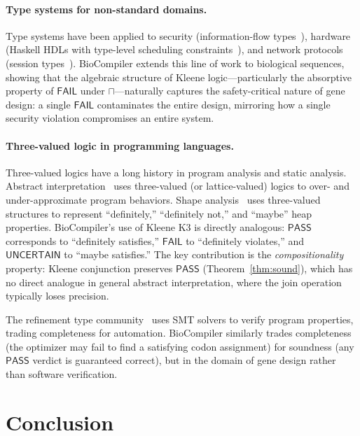 \documentclass[acmsmall,review,anonymous]{acmart}
\newcommand{\PASS}{\ensuremath{\mathsf{PASS}}\xspace}
\newcommand{\FAIL}{\ensuremath{\mathsf{FAIL}}\xspace}
\newcommand{\UNCERTAIN}{\ensuremath{\mathsf{UNCERTAIN}}\xspace}
\begin{document}
\paragraph{Type systems for non-standard domains.}
Type systems have been applied to security (information-flow
types~\cite{abadi2000security}), hardware (Haskell HDLs with
type-level scheduling constraints~\cite{hanna2010hardware}), and network
protocols (session types~\cite{mandel2005bidirectional}).  BioCompiler
extends this line of work to biological sequences, showing that the
algebraic structure of Kleene logic---particularly the absorptive
property of $\FAIL$ under $\sqcap$---naturally captures the
safety-critical nature of gene design: a single \FAIL{} contaminates the
entire design, mirroring how a single security violation compromises an
entire system.

\paragraph{Three-valued logic in programming languages.}
Three-valued logics have a long history in program analysis and static
analysis.  Abstract interpretation~\cite{cousot1977abstract} uses
three-valued (or lattice-valued) logics to over- and under-approximate
program behaviors.  Shape analysis~\cite{sagiv2002shape} uses
three-valued structures to represent ``definitely,'' ``definitely not,''
and ``maybe'' heap properties.  BioCompiler's use of Kleene K3 is
directly analogous: \PASS{} corresponds to ``definitely satisfies,''
\FAIL{} to ``definitely violates,'' and \UNCERTAIN{} to ``maybe
satisfies.''  The key contribution is the \emph{compositionality}
property: Kleene conjunction preserves \PASS{} (Theorem~\ref{thm:sound}),
which has no direct analogue in general abstract interpretation, where
the join operation typically loses precision.

The refinement type community~\cite{rondon2008liquid} uses SMT solvers
to verify program properties, trading completeness for automation.
BioCompiler similarly trades completeness (the optimizer may fail to find
a satisfying codon assignment) for soundness (any \PASS{} verdict is
guaranteed correct), but in the domain of gene design rather than
software verification.



\section{Conclusion}\label{sec:conclusion}
\end{document}
